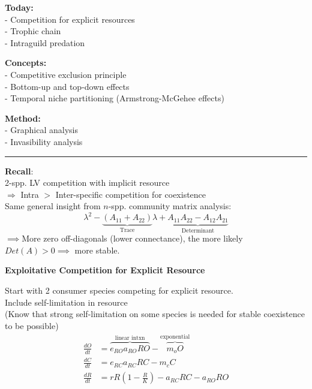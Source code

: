 \documentclass{article}
\newcommand{\ind}{\-\hspace{1cm}}
\begin{document}
\noindent{}

\textbf{Today:}\\
\ind - Competition for explicit resources\\
\ind - Trophic chain\\
\ind - Intraguild predation

\textbf{Concepts:}\\
\ind - Competitive exclusion principle\\
\ind - Bottom-up and top-down effects\\
\ind - Temporal niche partitioning (Armstrong-McGehee effects)

\textbf{Method:}\\
\ind - Graphical analysis\\
\ind - Invasibility analysis

\rule[0.5ex]{\linewidth}{1pt}

\textbf{Recall}:\\
2-spp. LV competition with implicit resource\\
\ind \ind $\Rightarrow$ Intra $>$ Inter-specific competition for coexistence\\
Same general insight from $n$-spp. community matrix analysis:
\begin{equation*}
	\lambda^2 - \underbrace{(A_{11}+A_{22})}_{\text{Trace}}\lambda + \underbrace{A_{11}A_{22} - A_{12}A_{21}}_{\text{Determinant}}
\end{equation*}
\ind $\implies$More zero off-diagonals (lower connectance), the more likely $Det(A)>0 \implies $ more stable.\\

\begin{center}
	\textbf{Exploitative Competition for Explicit Resource}
\end{center}

Start with 2 consumer species competing for explicit resource.\\
\ind Include self-limitation in resource\\
\ind  (Know that strong self-limitation on some species is needed for stable coexistence to be possible)
\begin{align*}
	\frac{dO}{dt}&=\overbrace{e_{RO}a_{RO}R O}^{\text{linear intxn}} - \overbrace{m_o O}^{\text{exponential}}\\
	\frac{dC}{dt}&=e_{RC}a_{RC}RC - m_c C\\
	\frac{dR}{dt}&=r R \left(1-\frac{R}{K}\right) - a_{RC}RC - a_{RO}RO
\end{align*}
\end{document}
